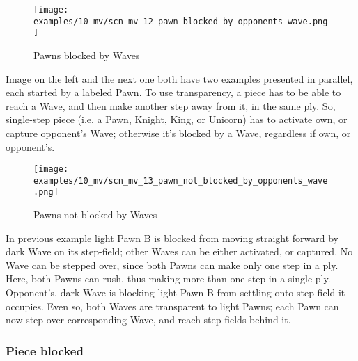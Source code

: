 \vspace*{-0.7\baselineskip}
\noindent
\begin{wrapfigure}[13]{l}{0.4\textwidth}
\centering
\texttt{[image: examples/10\_mv/scn\_mv\_12\_pawn\_blocked\_by\_opponents\_wave.png]}
\vspace*{-1.4\baselineskip}
\caption{Pawns blocked by Waves}
\label{fig:scn_mv_12_pawn_blocked_by_opponents_wave}
\end{wrapfigure}
Image on the left and the next one both have two examples presented in parallel,
each started by a labeled Pawn.\newline
\indent
To use transparency, a piece has to be able to reach a Wave, and then make another
step away from it, in the same ply. So, single-step piece (i.e. a Pawn, Knight, King,
or Unicorn) has to activate own, or capture opponent's Wave; otherwise it's blocked
by a Wave, regardless if own, or opponent's.

\vspace*{1.1\baselineskip}
\noindent
\begin{wrapfigure}[16]{l}{0.4\textwidth}
\centering
\texttt{[image: examples/10\_mv/scn\_mv\_13\_pawn\_not\_blocked\_by\_opponents\_wave.png]}
\vspace*{-1.4\baselineskip}
\caption{Pawns not blocked by Waves}
\label{fig:scn_mv_13_pawn_not_blocked_by_opponents_wave}
\end{wrapfigure}
In previous example light Pawn B is blocked from moving straight forward by dark
Wave on its step-field; other Waves can be either activated, or captured. No Wave
can be stepped over, since both Pawns can make only one step in a ply.\newline
\indent
Here, both Pawns can rush, thus making more than one step in a single ply. Opponent's,
dark Wave is blocking light Pawn B from settling onto step-field it occupies. Even so,
both Waves are transparent to light Pawns; each Pawn can now step over corresponding
Wave, and reach step-fields behind it.

\clearpage %

\subsubsection*{Piece blocked}
\label{sec:Miranda's veil/Wave/Activation/Piece blocked}

